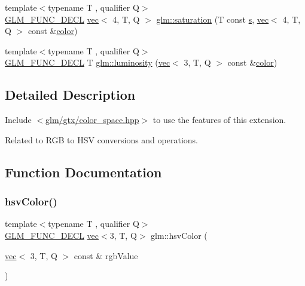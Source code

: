 \begin{DoxyCompactItemize}
\item 
{\footnotesize template$<$typename T , qualifier Q$>$ }\\\mbox{\hyperlink{setup_8hpp_ab2d052de21a70539923e9bcbf6e83a51}{G\+L\+M\+\_\+\+F\+U\+N\+C\+\_\+\+D\+E\+CL}} \mbox{\hyperlink{structglm_1_1vec}{vec}}$<$ 4, T, Q $>$ \mbox{\hyperlink{group__gtx__color__space_gaba0eacee0736dae860e9371cc1ae4785}{glm\+::saturation}} (T const \mbox{\hyperlink{_s_d_l__opengl_8h_a4af680a6c683f88ed67b76f207f2e6e4}{s}}, \mbox{\hyperlink{structglm_1_1vec}{vec}}$<$ 4, T, Q $>$ const \&\mbox{\hyperlink{_s_d_l__opengl__glext_8h_a3ea846f998d64f079b86052b6c4193a8}{color}})
\item 
{\footnotesize template$<$typename T , qualifier Q$>$ }\\\mbox{\hyperlink{setup_8hpp_ab2d052de21a70539923e9bcbf6e83a51}{G\+L\+M\+\_\+\+F\+U\+N\+C\+\_\+\+D\+E\+CL}} T \mbox{\hyperlink{group__gtx__color__space_gad028e0a4f1a9c812b39439b746295b34}{glm\+::luminosity}} (\mbox{\hyperlink{structglm_1_1vec}{vec}}$<$ 3, T, Q $>$ const \&\mbox{\hyperlink{_s_d_l__opengl__glext_8h_a3ea846f998d64f079b86052b6c4193a8}{color}})
\end{DoxyCompactItemize}


\subsection{Detailed Description}
Include $<$\mbox{\hyperlink{gtx_2color__space_8hpp}{glm/gtx/color\+\_\+space.\+hpp}}$>$ to use the features of this extension.

Related to R\+GB to H\+SV conversions and operations. 

\subsection{Function Documentation}
\mbox{\label{group__gtx__color__space_ga789802bec2d4fe0f9741c731b4a8a7d8}} 
\subsubsection{\texorpdfstring{hsv\+Color()}{hsvColor()}}
{\footnotesize\ttfamily template$<$typename T , qualifier Q$>$ \\
\mbox{\hyperlink{setup_8hpp_ab2d052de21a70539923e9bcbf6e83a51}{G\+L\+M\+\_\+\+F\+U\+N\+C\+\_\+\+D\+E\+CL}} \mbox{\hyperlink{structglm_1_1vec}{vec}}$<$3, T, Q$>$ glm\+::hsv\+Color (\begin{DoxyParamCaption}\item[{\mbox{\hyperlink{structglm_1_1vec}{vec}}$<$ 3, T, Q $>$ const \&}]{rgb\+Value }\end{DoxyParamCaption})}

